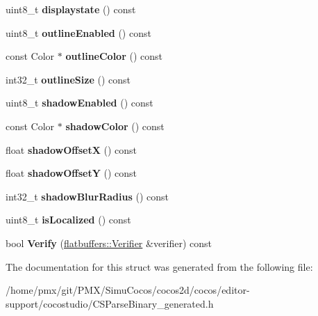 \begin{DoxyCompactItemize}
uint8\+\_\+t {\bfseries displaystate} () const
\item 
\mbox{\label{structflatbuffers_1_1ButtonOptions_ad72dc212bcd1408e3c2668524e7060fc}} 
uint8\+\_\+t {\bfseries outline\+Enabled} () const
\item 
\mbox{\label{structflatbuffers_1_1ButtonOptions_ad62885522174df62a086da0b6d42cf64}} 
const Color $\ast$ {\bfseries outline\+Color} () const
\item 
\mbox{\label{structflatbuffers_1_1ButtonOptions_a78f24524b2e27f428cbaa257603ecea8}} 
int32\+\_\+t {\bfseries outline\+Size} () const
\item 
\mbox{\label{structflatbuffers_1_1ButtonOptions_a9992c10832b0c8bb9554da66940225e3}} 
uint8\+\_\+t {\bfseries shadow\+Enabled} () const
\item 
\mbox{\label{structflatbuffers_1_1ButtonOptions_aec7c7b25743a25417a4f54128c53c588}} 
const Color $\ast$ {\bfseries shadow\+Color} () const
\item 
\mbox{\label{structflatbuffers_1_1ButtonOptions_a24f36335243772c80b5c2d6812f26f8a}} 
float {\bfseries shadow\+OffsetX} () const
\item 
\mbox{\label{structflatbuffers_1_1ButtonOptions_af64b35ccd828d0e4b4c2644631a98d92}} 
float {\bfseries shadow\+OffsetY} () const
\item 
\mbox{\label{structflatbuffers_1_1ButtonOptions_adac01a6fc0d8f16f8058524c3fb6d14f}} 
int32\+\_\+t {\bfseries shadow\+Blur\+Radius} () const
\item 
\mbox{\label{structflatbuffers_1_1ButtonOptions_a8bb21d079c6a5bedce478428a894ad22}} 
uint8\+\_\+t {\bfseries is\+Localized} () const
\item 
\mbox{\label{structflatbuffers_1_1ButtonOptions_a5a1af4dbd8ea47df041677a6886d9d24}} 
bool {\bfseries Verify} (\hyperlink{classflatbuffers_1_1Verifier}{flatbuffers\+::\+Verifier} \&verifier) const
\end{DoxyCompactItemize}


The documentation for this struct was generated from the following file\+:\begin{DoxyCompactItemize}
\item 
/home/pmx/git/\+P\+M\+X/\+Simu\+Cocos/cocos2d/cocos/editor-\/support/cocostudio/C\+S\+Parse\+Binary\+\_\+generated.\+h\end{DoxyCompactItemize}
